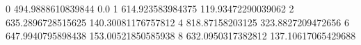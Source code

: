 0 494.9888610839844 0.0
1 614.923583984375 119.93472290039062
2 635.2896728515625 140.30081176757812
4 818.87158203125 323.8827209472656
6 647.9940795898438 153.00521850585938
8 632.0950317382812 137.10617065429688
